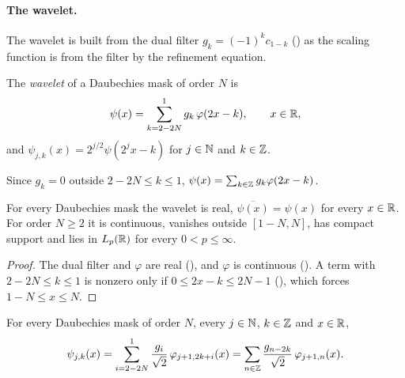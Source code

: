 \paragraph{The wavelet.}
The wavelet is built from the dual filter $g_k = (-1)^k c_{1-k}$ () as
the scaling function is from the filter by the refinement equation.

\begin{definition}
\label{def:daub-wavelet}
\leanok
{}
The \emph{wavelet} of a Daubechies mask of order $N$ is
\[
  \psi(x) = \sum_{k = 2 - 2N}^{1} g_k \, \varphi(2x - k) , \qquad x \in \mathbb{R} ,
\]
and $\psi_{j,k}(x) = 2^{j/2} \psi(2^j x - k)$ for $j \in \mathbb{N}$ and $k \in \mathbb{Z}$.
\end{definition}

Since $g_k = 0$ outside $2 - 2N \leq k \leq 1$, $\psi(x) = \sum_{k \in \mathbb{Z}} g_k \varphi(2x - k)$.

\begin{lemma}
\label{lem:daub-wavelet-basic}
\leanok
{}
For every Daubechies mask the wavelet is real, $\overline{\psi(x)} = \psi(x)$ for every
$x \in \mathbb{R}$. For order $N \geq 2$ it is continuous, vanishes outside $[1 - N, N]$, has compact
support and lies in $L_p(\mathbb{R})$ for every $0 < p \leq \infty$.
\end{lemma}

\begin{proof}
\leanok
{}
The dual filter and $\varphi$ are real (), and $\varphi$ is
continuous (). A term with $2 - 2N \leq k \leq 1$ is nonzero
only if $0 \leq 2x - k \leq 2N - 1$ (), which forces
$1 - N \leq x \leq N$.
\end{proof}

\begin{lemma}
\label{lem:daub-wavelet-refine}
\leanok
{}
For every Daubechies mask of order $N$, every $j \in \mathbb{N}$, $k \in \mathbb{Z}$ and $x \in \mathbb{R}$,
\[
  \psi_{j,k}(x) = \sum_{i = 2 - 2N}^{1} \frac{g_i}{\sqrt 2} \, \varphi_{j+1, 2k+i}(x)
  = \sum_{n \in \mathbb{Z}} \frac{g_{n-2k}}{\sqrt 2} \, \varphi_{j+1,n}(x) .
\]
\end{lemma}


